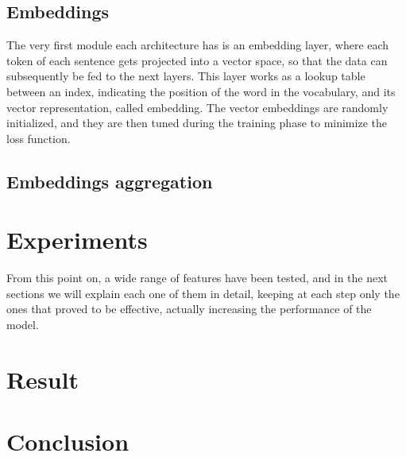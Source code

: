 \documentclass[11pt,a4paper]{article}
\begin{document}
	\subsection{Embeddings}
	The very first module each architecture has is an embedding layer, where each token of each sentence gets projected into a vector space, so that the data can subsequently be fed to the next layers. This layer works as a lookup table between an index, indicating the position of the word in the vocabulary, and its vector representation, called embedding. The vector embeddings are randomly initialized, and they are then tuned during the training phase to minimize the loss function.
	
	\subsection{Embeddings aggregation}
	
	

	
	
	
	
	
	\section{Experiments}
	From this point on, a wide range of features have been tested, and in the next sections we will explain each one of them in detail, keeping at each step only the ones that proved to be effective, actually increasing the performance of the model.
	\section{Result}
	
	\section{Conclusion}
	
	
	
	
	
	
	
	
\end{document}
